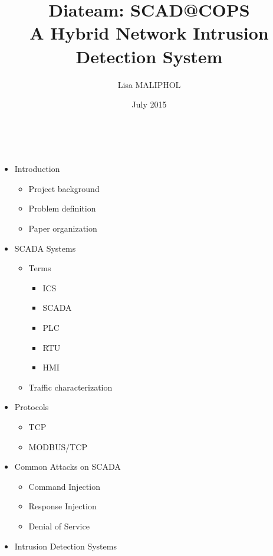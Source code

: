 \documentclass[]{article}
\title{Diateam: SCAD@COPS\\A Hybrid Network Intrusion Detection System}
\author{Lisa MALIPHOL}
\date{July 2015}
\begin{document}
\maketitle


~ ~

\begin{itemize}
\item
  Introduction

  \begin{itemize}
  \itemsep1pt\parskip0pt
  \item
    Project background
  \item
    Problem definition
  \item
    Paper organization
  \end{itemize}
\item
  SCADA Systems

  \begin{itemize}
  \itemsep1pt\parskip0pt
  \item
    Terms

    \begin{itemize}
    \itemsep1pt\parskip0pt
    \item
      ICS
    \item
      SCADA
    \item
      PLC
    \item
      RTU
    \item
      HMI
    \end{itemize}
  \item
    Traffic characterization
  \end{itemize}
\item
  Protocols

  \begin{itemize}
  \itemsep1pt\parskip0pt
  \item
    TCP
  \item
    MODBUS/TCP
  \end{itemize}
\item
  Common Attacks on SCADA

  \begin{itemize}
  \itemsep1pt\parskip0pt
  \item
    Command Injection
  \item
    Response Injection
  \item
    Denial of Service
  \end{itemize}
\item
  Intrusion Detection Systems


\end{itemize}
\end{document}
